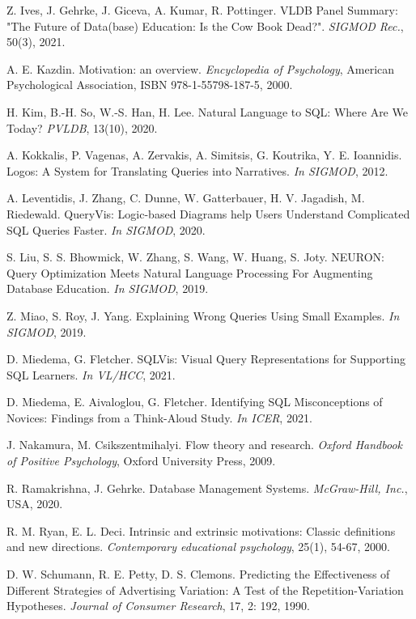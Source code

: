 \documentclass[11pt]{article}
\begin{document}
\begin{thebibliography}{10}
\begin{small}
 Z. Ives,  J. Gehrke, J. Giceva, A. Kumar, R. Pottinger. VLDB Panel Summary: "The Future of Data(base) Education: Is the Cow Book Dead?". \textit{SIGMOD Rec.}, 50(3), 2021.

 A. E. Kazdin. Motivation: an overview. \textit{Encyclopedia of Psychology}, American Psychological Association,  ISBN 978-1-55798-187-5, 2000.

 H. Kim,  B.-H. So, W.-S. Han, H. Lee. Natural Language to SQL: Where Are We Today? \textit{PVLDB}, 13(10), 2020.

 A. Kokkalis, P. Vagenas, A. Zervakis, A. Simitsis, G. Koutrika, Y. E. Ioannidis. Logos: A System for Translating Queries into Narratives. \textit{In SIGMOD}, 2012.

 A. Leventidis, J. Zhang, C. Dunne, W. Gatterbauer, H. V. Jagadish, M. Riedewald. QueryVis: Logic-based Diagrams help Users Understand Complicated SQL Queries Faster. \textit{In SIGMOD}, 2020.

 S. Liu, S. S. Bhowmick, W. Zhang, S. Wang, W. Huang, S. Joty. NEURON: Query Optimization Meets Natural Language Processing For Augmenting Database Education. \textit{In SIGMOD}, 2019.

 Z. Miao, S. Roy, J. Yang. Explaining Wrong Queries Using Small Examples. \textit{In SIGMOD}, 2019.

 D. Miedema, G. Fletcher. SQLVis: Visual Query Representations for Supporting SQL Learners. \textit{In VL/HCC}, 2021.


 D. Miedema, E. Aivaloglou, G. Fletcher. Identifying SQL Misconceptions of Novices: Findings from a Think-Aloud Study. \textit{In ICER}, 2021.

 J. Nakamura, M. Csikszentmihalyi. Flow theory and research. \textit{Oxford Handbook of Positive Psychology}, Oxford University Press, 2009.

 R. Ramakrishna, J. Gehrke.  Database Management Systems. \textit{McGraw-Hill, Inc.}, USA, 2020.


 R. M. Ryan, E. L. Deci. Intrinsic and extrinsic motivations: Classic definitions and new directions. \textit{Contemporary educational psychology}, 25(1), 54-67, 2000.

 D. W. Schumann, R. E. Petty, D. S. Clemons. Predicting the Effectiveness of Different Strategies of Advertising Variation: A Test of the Repetition-Variation Hypotheses. \textit{Journal of Consumer Research}, 17, 2: 192, 1990.


\end{small}
\end{thebibliography}
\end{document}
